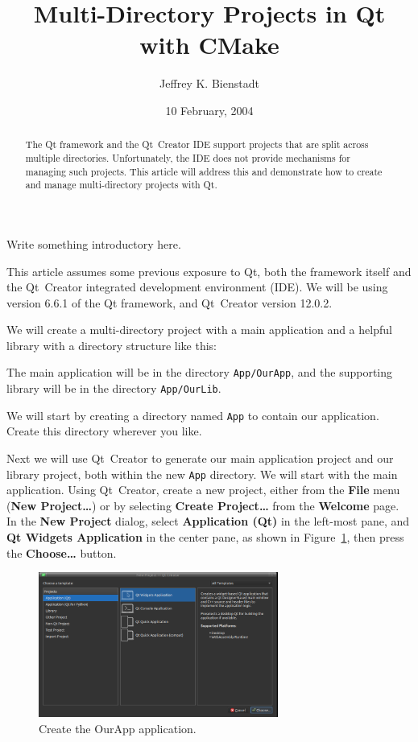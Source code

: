 \documentclass[letterpaper]{article}
\begin{document}
\title{Multi-Directory Projects in Qt with CMake}
\author{Jeffrey K. Bienstadt}
\date{10 February, 2004}
\maketitle

\begin{abstract}
  The Qt framework and the Qt~Creator IDE support projects that are split across
  multiple directories. Unfortunately, the IDE does not provide mechanisms for
  managing such projects. This article will address this and demonstrate how to
  create and manage multi-directory projects with Qt.
\end{abstract}

Write something introductory here.

This article assumes some previous exposure to Qt, both the framework itself and
the Qt~Creator integrated development environment (IDE). We will be using version
6.6.1 of the Qt framework, and Qt~Creator version 12.0.2.

We will create a multi-directory project with a main application and a helpful
library with a directory structure like this:
\begin{figure}[h!]
\centering
\begin{minipage}{5cm}
\end{minipage}
\end{figure}

The main application will be in the directory \verb|App/OurApp|, and the supporting
library will be in the directory \verb|App/OurLib|.

We will start by creating a directory named \verb|App| to contain our application.
Create this directory wherever you like.

Next we will use Qt~Creator to generate our main application project and our
library project, both within the new \verb|App| directory. We will start with the main application. Using Qt~Creator,
create a new project, either from the \textbf{File} menu
(\textbf{New Project\ldots}) or by selecting \textbf{Create Project\ldots}
from the \textbf{Welcome} page. In the \textbf{New Project} dialog, select 
\textbf{Application (Qt)} in the left-most pane, and \textbf{Qt Widgets Application}
in the center pane, as shown in Figure~\ref{fig:create_ourapp_1}, then press the \textbf{Choose\ldots} button.
\begin{figure}[H]
  \centering
  \includegraphics[width=0.7\textwidth]{create_ourapp_1.png}
  \caption{Create the OurApp application.}
  \label{fig:create_ourapp_1}
\end{figure}
\end{document}
